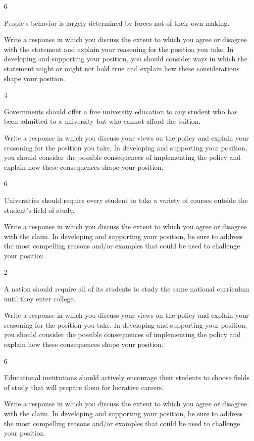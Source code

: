 \documentclass[]{article}
\begin{document}
6

People's behavior is largely determined by forces not of their own
making.

Write a response in which you discuss the extent to which you agree or
disagree with the statement and explain your reasoning for the position
you take. In developing and supporting your position, you should
consider ways in which the statement might or might not hold true and
explain how these considerations shape your position.

4

Governments should offer a free university education to any student who
has been admitted to a university but who cannot afford the tuition.

Write a response in which you discuss your views on the policy and
explain your reasoning for the position you take. In developing and
supporting your position, you should consider the possible consequences
of implementing the policy and explain how these consequences shape your
position.

6

Universities should require every student to take a variety of courses
outside the student's field of study.

Write a response in which you discuss the extent to which you agree or
disagree with the claim. In developing and supporting your position, be
sure to address the most compelling reasons and/or examples that could
be used to challenge your position.

2

A nation should require all of its students to study the same national
curriculum until they enter college.

Write a response in which you discuss your views on the policy and
explain your reasoning for the position you take. In developing and
supporting your position, you should consider the possible consequences
of implementing the policy and explain how these consequences shape your
position.

6

Educational institutions should actively encourage their students to
choose fields of study that will prepare them for lucrative careers.

Write a response in which you discuss the extent to which you agree or
disagree with the claim. In developing and supporting your position, be
sure to address the most compelling reasons and/or examples that could
be used to challenge your position.
\end{document}
